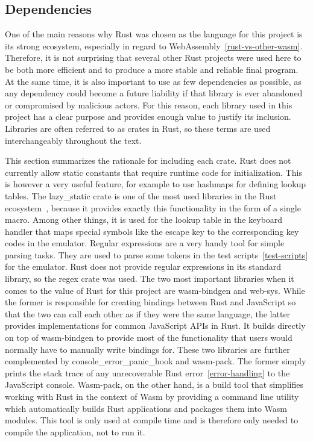 \subsection{Dependencies}
\label{rust-deps}
One of the main reasons why Rust was chosen as the language for this project is its strong ecosystem, especially in regard to WebAssembly~\ref{rust-vs-other-wasm}.
Therefore, it is not surprising that several other Rust projects were used here to be both more efficient and to produce a more stable and reliable final program.
At the same time, it is also important to use as few dependencies as possible, as any dependency could become a future liability if that library is ever abandoned or compromised by malicious actors.
For this reason, each library used in this project has a clear purpose and provides enough value to justify its inclusion. Libraries are often referred to as crates in Rust, so these terms are used interchangeably throughout the text.

This section summarizes the rationale for including each crate.
Rust does not currently allow static constants that require runtime code for initialization.
This is however a very useful feature, for example to use hashmaps for defining lookup tables.
The lazy\_static crate is one of the most used libraries in the Rust ecosystem~\cite[Downloads all time]{lazystatic}, because it provides exactly this functionality in the form of a single macro.
Among other things, it is used for the lookup table in the keyboard handler that maps special symbols like the escape key to the corresponding key codes in the emulator.
Regular expressions are a very handy tool for simple parsing tasks. They are used to parse some tokens in the test scripts~\ref{test-scripts} for the emulator. Rust does not provide regular expressions in its standard library, so the regex crate was used.
\label{web-sys}
The two most important libraries when it comes to the value of Rust for this project are wasm-bindgen and web-sys.
While the former is responsible for creating bindings between Rust and JavaScript so that the two can call each other as if they were the same language, the latter provides implementations for common JavaScript APIs in Rust.
It builds directly on top of wasm-bindgen to provide most of the functionality that users would normally have to manually write bindings for.
These two libraries are further complemented by console\_error\_panic\_hook and wasm-pack.
The former simply prints the stack trace of any unrecoverable Rust error~\ref{error-handling} to the JavaScript console.
Wasm-pack, on the other hand, is a build tool that simplifies working with Rust in the context of Wasm by providing a command line utility which automatically builds Rust applications and packages them into Wasm modules.
This tool is only used at compile time and is therefore only needed to compile the application, not to run it.

